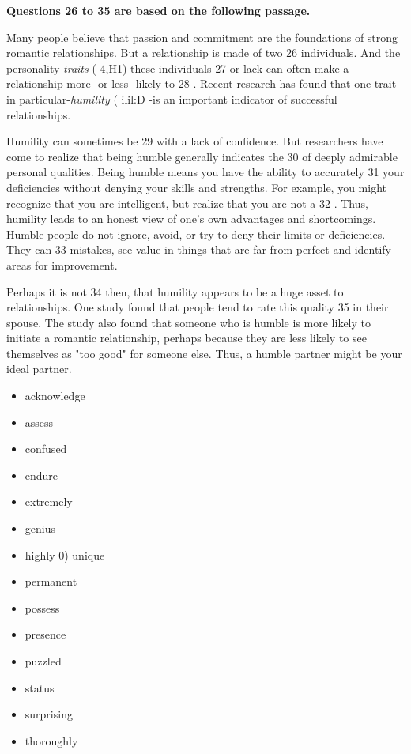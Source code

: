 \documentclass[UTF8,11pt]{ctexart}
\begin{document}
\textbf{Questions 26 to 35 are based on the following passage.}


Many people believe that passion and commitment are the foundations of strong romantic relationships. But a relationship is made of two 26 individuals. And the personality \textit{traits }( 4,H1) these individuals 27 or lack can often make a relationship more- or less- likely to 28 . Recent research has found that one trait in particular-\textit{humility }( ilil:D -is an important indicator of successful relationships.


Humility can sometimes be 29 with a lack of confidence. But researchers have come to realize that being humble generally indicates the 30 of deeply admirable personal qualities. Being humble means you have the ability to accurately 31 your deficiencies without denying your skills and strengths. For example, you might recognize that you are intelligent, but realize that you are not a 32 . Thus, humility leads to an honest view of one's own advantages and shortcomings. Humble people do not ignore, avoid, or try to deny their limits or deficiencies. They can 33 mistakes, see value in things that are far from perfect and identify areas for improvement.


Perhaps it is not 34 then, that humility appears to be a huge asset to relationships. One study found that people tend to rate this quality 35 in their spouse. The study also found that someone who is humble is more likely to initiate a romantic relationship, perhaps because they are less likely to see themselves as "too good" for someone else. Thus, a humble partner might be your ideal partner.


\begin{itemize}[leftmargin=2em,itemsep=.2em,topsep=.4em]\item[A.] acknowledge
\item[B.] assess
\item[C.] confused
\item[D.] endure
\item[E.] extremely
\item[F.] genius
\item[G.] highly 0) unique
\item[H.] permanent
\item[I.] possess
\item[J.] presence
\item[K.] puzzled
\item[L.] status
\item[M.] surprising
\item[N.] thoroughly
\end{itemize}
\end{document}
